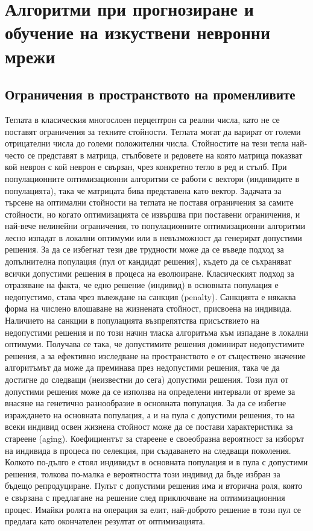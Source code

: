 ﻿\chapter{Алгоритми при прогнозиране и обучение на изкуствени невронни мрежи}

\section{Ограничения в пространството на променливите}

Теглата в класическия многослоен перцептрон са реални числа, като не се поставят ограничения за техните стойности. Теглата могат да варират от големи отрицателни числа до големи положителни числа. Стойностите на тези тегла най-често се представят в матрица, стълбовете и редовете на която матрица показват кой неврон с кой неврон е свързан, чрез конкретно тегло в ред и стълб. При популационните оптимизационни алгоритми се работи с вектори (индивидите в популацията), така че матрицата бива представена като вектор. Задачата за търсене на оптимални стойности на теглата не поставя ограничения за самите стойности, но когато оптимизацията се извършва при поставени ограничения, и най-вече нелинейни ограничения, то популационните оптимизационни алгоритми лесно изпадат в локални оптимуми или в невъзможност да генерират допустими решения. За да се избегнат тези две трудности може да се въведе подход за допълнителна популация (пул от кандидат решения), където да се съхраняват всички допустими решения в процеса на еволюиране. Класическият подход за отразяване на факта, че едно решение (индивид) в основната популация е недопустимо, става чрез въвеждане на санкция (penalty). Санкцията е някаква форма на числено влошаване на жизнената стойност, присвоена на индивида. Наличието на санкции в популацията възпрепятства присъствието на недопустими решения и по този начин тласка алгоритъма към изпадане в локални оптимуми. Получава се така, че допустимите решения доминират недопустимите решения, а за ефективно изследване на пространството е от съществено значение алгоритъмът да може да преминава през недопустими решения, така че да достигне до следващи (неизвестни до сега) допустими решения. Този пул от допустими решения може да се използва на определени интервали от време за внасяне на генетично разнообразие в основната популация. За да се избегне израждането на основната популация, а и на пула с допустими решения, то на всеки индивид освен жизнена стойност може да се постави характеристика за стареене (aging). Коефициентът за стареене е своеобразна вероятност за изборът на индивида в процеса по селекция, при създаването на следващи поколения. Колкото по-дълго е стоял индивидът в основната популация и в пула с допустими решения, толкова по-малка е вероятността този индивид да бъде избран за бъдещо репродуциране. Пулът с допустими решения има и вторична роля, която е свързана с предлагане на решение след приключване на оптимизационния процес. Имайки ролята на операция за елит, най-доброто решение в този пул се предлага като окончателен резултат от оптимизацията. 


